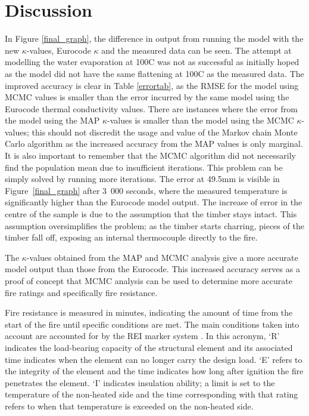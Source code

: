 \chapter{Discussion} \label{discussion}

In Figure \ref{final_graph}, the difference in output from running the model with the new $\kappa$-values, Eurocode $\kappa$ and the measured data can be seen. 
The attempt at modelling the water evaporation at 100\textdegree C was not as successful as initially hoped as the model did not have the same flattening at 100\textdegree C as the measured data.
The improved accuracy is clear in Table \ref{errortab}, as the RMSE for the model using MCMC values is smaller than the error incurred by the same model using the Eurocode thermal conductivity values.
There are instances where the error from the model using the MAP $\kappa$-values is smaller than the model using the MCMC $\kappa$-values; this should not discredit the usage and value of the Markov chain Monte Carlo algorithm as the increased accuracy from the MAP values is only marginal.
It is also important to remember that the MCMC algorithm did not necessarily find the population mean due to insufficient iterations.
This problem can be simply solved by running more iterations.
The error at 49.5mm is visible in Figure~\ref{final_graph} after 3~000 seconds, where the measured temperature is significantly higher than the Eurocode model output.
The increase of error in the centre of the sample is due to the assumption that the timber stays intact.
This assumption oversimplifies the problem; as the timber starts charring, pieces of the timber fall off, exposing an internal thermocouple directly to the fire.


The $\kappa$-values obtained from the MAP and MCMC analysis give a more accurate model output than those from the Eurocode.
This increased accuracy serves as a proof of concept that MCMC analysis can be used to determine more accurate fire ratings and specifically fire resistance. 

Fire resistance is measured in minutes, indicating the amount of time from the start of the fire until specific conditions are met. 
The main conditions taken into account are accounted for by the REI marker system \citep{rei:2021}. 
In this acronym, `R' indicates the load-bearing capacity of the structural element and its associated time indicates when the element can no longer carry the design load.
`E' refers to the integrity of the element and the time indicates how long after ignition the fire penetrates the element.
`I' indicates insulation ability; a limit is set to the temperature of the non-heated side and the time corresponding with that rating refers to when that temperature is exceeded on the non-heated side.


